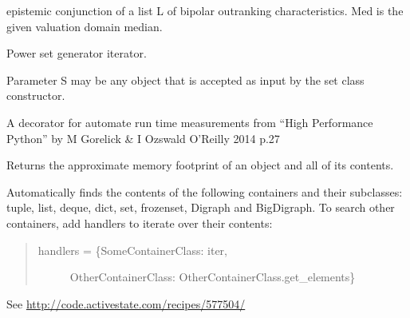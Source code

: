 \documentclass[letterpaper,10pt,english]{sphinxmanual}
\begin{document}

\begin{fulllineitems}
\label{techDoc:digraphs.omin}
epistemic conjunction of a list L of bipolar outranking characteristics.
Med is the given valuation domain median.

\end{fulllineitems}


\begin{fulllineitems}
\label{techDoc:digraphs.powerset}
Power set generator iterator.

Parameter S may be any object that is accepted as input by the set class constructor.

\end{fulllineitems}


\begin{fulllineitems}
\label{techDoc:digraphs.ranking2preorder}
\end{fulllineitems}


\begin{fulllineitems}
\label{techDoc:digraphs.timefn}
A decorator for automate run time measurements
from ``High Performance Python'' by  M Gorelick \& I Ozswald
O'Reilly 2014 p.27

\end{fulllineitems}


\begin{fulllineitems}
\label{techDoc:digraphs.total_size}
Returns the approximate memory footprint of an object and all of its contents.

Automatically finds the contents of the following containers and
their subclasses:  tuple, list, deque, dict, set, frozenset, Digraph and BigDigraph.
To search other containers, add handlers to iterate over their contents:
\begin{quote}
\begin{description}
\item[{handlers = \{SomeContainerClass: iter,}] \leavevmode
OtherContainerClass: OtherContainerClass.get\_elements\}

\end{description}
\end{quote}

See \href{http://code.activestate.com/recipes/577504/}{http://code.activestate.com/recipes/577504/}

\end{fulllineitems}
\end{document}
